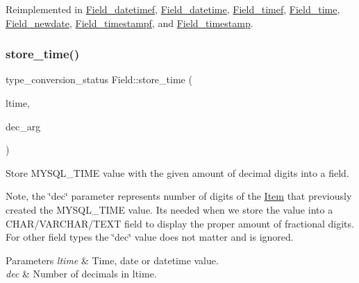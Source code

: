 Reimplemented in \mbox{\hyperlink{classField__datetimef_a16ff3d457851e43787c57916ea614241}{Field\+\_\+datetimef}}, \mbox{\hyperlink{classField__datetime_aa9d26c9ee5595f5c10303bee4665a9e6}{Field\+\_\+datetime}}, \mbox{\hyperlink{classField__timef_a02f430536cb0135e28b813aed91579d2}{Field\+\_\+timef}}, \mbox{\hyperlink{classField__time_af220bb15b6679e6c7dfb7964d9521f6e}{Field\+\_\+time}}, \mbox{\hyperlink{classField__newdate_a4f741d8531290394ba08ee165498e830}{Field\+\_\+newdate}}, \mbox{\hyperlink{classField__timestampf_ae2dfad15c21906d8651e3f52bdc6c263}{Field\+\_\+timestampf}}, and \mbox{\hyperlink{classField__timestamp_aed9a6035937206a33864b8a6124791ee}{Field\+\_\+timestamp}}.

\mbox{\label{classField_a7433aa07355def6c394687567256e6cf}} 
\subsubsection{\texorpdfstring{store\+\_\+time()}{store\_time()}\hspace{0.1cm}{\footnotesize\ttfamily [1/2]}}
{\footnotesize\ttfamily type\+\_\+conversion\+\_\+status Field\+::store\+\_\+time (\begin{DoxyParamCaption}\item[{M\+Y\+S\+Q\+L\+\_\+\+T\+I\+ME $\ast$}]{ltime,  }\item[{uint8}]{dec\+\_\+arg }\end{DoxyParamCaption})\hspace{0.3cm}{\ttfamily [virtual]}}

Store M\+Y\+S\+Q\+L\+\_\+\+T\+I\+ME value with the given amount of decimal digits into a field.

Note, the \char`\"{}dec\char`\"{} parameter represents number of digits of the \mbox{\hyperlink{classItem}{Item}} that previously created the M\+Y\+S\+Q\+L\+\_\+\+T\+I\+ME value. It\textquotesingle{}s needed when we store the value into a C\+H\+A\+R/\+V\+A\+R\+C\+H\+A\+R/\+T\+E\+XT field to display the proper amount of fractional digits. For other field types the \char`\"{}dec\char`\"{} value does not matter and is ignored.


\begin{DoxyParams}{Parameters}
{\em ltime} & Time, date or datetime value. \\
\hline
{\em dec} & Number of decimals in ltime. \\
\hline
\end{DoxyParams}

